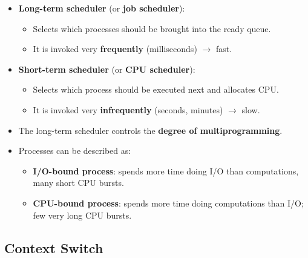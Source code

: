 \documentclass[10pt]{article}
\newcommand{\tf}{\textbf}
\newcommand{\rarrow}{\rightarrow}
\begin{document}
\begin{itemize}
	\item \tf{Long-term scheduler} (or \tf{job scheduler}): 
	\begin{itemize}
		\item Selects which processes should be brought into the ready queue.
		\item It is invoked very \tf{frequently} (milliseconds) $\rarrow$ fast.
	\end{itemize}
	\item \tf{Short-term scheduler} (or \tf{CPU scheduler}):
	\begin{itemize}
		\item Selects which process should be executed next and allocates CPU.
		\item It is invoked very \tf{infrequently} (seconds, minutes) $\rarrow$ slow.
	\end{itemize}

	\item The long-term scheduler controls the \tf{degree of multiprogramming}.
	\item Processes can be described as:
	\begin{itemize}
		\item \tf{I/O-bound process}: spends more time doing I/O than computations, many short CPU bursts.
		\item \tf{CPU-bound process}: spends more time doing computations than I/O; few very long CPU bursts.
	\end{itemize}
\end{itemize}

\subsection{Context Switch}
\end{document}
